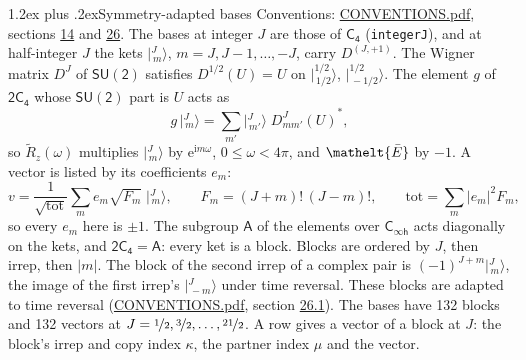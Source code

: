 \documentclass[10pt,a4paper]{article}
\makeatletter
\renewcommand\section{\@startsection{section}{1}{\z@}{-3ex plus -1ex minus -.2ex}%
  {1.2ex plus .2ex}{\normalfont\large\sffamily\bfseries\color{parttitle}}}
\numberwithin{equation}{section}
\newcommand{\eltfont}[1]{{\let\sigma\eltsigma\mathelt{#1}}}
\newcommand{\grp}[1]{\mathsf{#1}}
\newcommand{\elt}[1]{\eltfont{#1}}
\newcommand{\iunit}{\mathrm{i}}
\newcommand{\expe}{\mathrm{e}}
\newcommand{\irrJp}[2]{D^{(#1,#2)}}
\newcommand{\wignerD}[1]{D^{#1}}
\newcommand{\conj}[1]{{#1}^{*}}
\newcommand{\mult}{\kappa}
\newcommand{\intx}{\mu}
\newcommand{\jm}[2]{\bigl\lvert{}^{#1}_{\,#2}\bigr\rangle}
\newcommand{\barred}[1]{\bar{#1}}
\newcommand{\lift}[1]{\tilde{#1}}
\makeatother
\begin{document}
\section{Symmetry-adapted bases}\label{s:bases}
Conventions: \href{../../CONVENTIONS.pdf}{CONVENTIONS.pdf}, sections \href{../../../rotation/CONVENTIONS.pdf\#conv.14}{14} and \href{../../CONVENTIONS.pdf\#conv.26}{26}.
\leavevmode\label{n:index.m}\label{n:vector.ket}The bases at integer $J$ are those of \href{../../../rotation/data/pdf/C4.pdf}{$\grp{C_{4}}$} (\texttt{integerJ}), and at half-integer $J$ the kets $\jm{J}{m}$, $m = J, J-1, \dots, -J$, carry $\irrJp{J}{+1}$. \label{n:matrix.wigner}The Wigner matrix $\wignerD{J}$ of $\grp{SU(2)}$ satisfies $\wignerD{1/2}(U) = U$ on $\jm{1/2}{1/2}$, $\jm{1/2}{-1/2}$. The element $g$ of $\grp{2C_{4}}$ whose $\grp{SU(2)}$ part is $U$ acts as
\begin{equation}\label{e:action}g\,\jm{J}{m} = \sum_{m'} \jm{J}{m'}\; \conj{\wignerD{J}_{m m'}(U)},\end{equation}
so $\lift{R}_{z}(\omega)$ multiplies $\jm{J}{m}$ by $\expe^{\iunit m\omega}$, $0 \le \omega < 4\pi$, and $\elt{\barred{E}}$ by $-1$. \label{n:index.ketcoefficient}\label{n:vector.basis.symmetry}\label{n:index.ketweight}\label{n:index.total}A vector is listed by its coefficients $e_m$:
\begin{equation}\label{e:ket}v = \frac{1}{\sqrt{\mathrm{tot}}}\sum_m e_m\sqrt{F_m}\;\jm{J}{m},\qquad F_m = (J+m)!\,(J-m)!,\qquad \mathrm{tot} = \sum_m |e_m|^2F_m,\end{equation}
so every $e_m$ here is $\pm 1$.
\leavevmode\label{n:group.A}The subgroup $\grp{A}$ of the elements over $\grp{C_{\infty h}}$ acts diagonally on the kets, and $\grp{2C_{4}} = \grp{A}$: every ket is a block. Blocks are ordered by $J$, then irrep, then $|m|$. The block of the second irrep of a complex pair is $(-1)^{J+m}\jm{J}{m}$, the image of the first irrep's $\jm{J}{-m}$ under time reversal. These blocks are adapted to time reversal (\href{../../CONVENTIONS.pdf}{CONVENTIONS.pdf}, section \href{../../CONVENTIONS.pdf\#conv.26.1}{26.1}).
The bases have 132 blocks and 132 vectors at $J = \nicefrac{1}{2}, \nicefrac{3}{2}, \dots, \nicefrac{21}{2}$. \label{n:index.copy}\label{n:head.vector}A row gives a vector of a block at $J$: the block's irrep and copy index $\mult$, the partner index $\intx$ and the vector.
\end{document}
